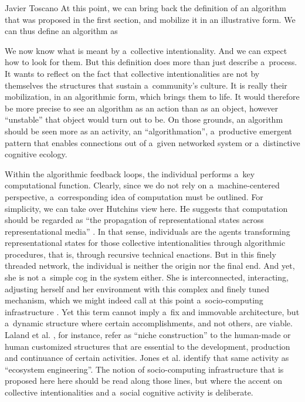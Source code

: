\begin{artengenv}{Javier Toscano}
At this point, we can bring back the definition of an algorithm that was proposed in the first section, and mobilize it in an illustrative form. We can thus define an algorithm as

We now know what is meant by a~collective intentionality. And we can expect how to look for them. But this definition does more than just describe a~process. It wants to reflect on the fact that collective intentionalities are not by themselves the structures that sustain a~community's culture. It is really their mobilization, in an algorithmic form, which brings them to life. It would therefore be more precise to see an algorithm as an action than as an object, however ``unstable'' that object would turn out to be. On those grounds, an algorithm should be seen more as an activity, an ``algorithmation'', a~productive emergent pattern that enables connections out of a~given networked system or a~distinctive cognitive ecology.

Within the algorithmic feedback loops, the individual performs a~key computational function. Clearly, since we do not rely on a~machine-centered perspective, a~corresponding idea of computation must be outlined. For simplicity, we can take over Hutchins view here. He suggests that computation should be regarded as ``the propagation of representational states across representational media''
\parencite[][p.118]{hutchins_cognition_1995}. %
 In that sense, individuals are the agents transforming representational states for those collective intentionalities through algorithmic procedures, that is, through recursive technical enactions. But in this finely threaded network, the individual is neither the origin nor the final end. And yet, she is not a~simple cog in the system either. She is interconnected, interacting, adjusting herself and her environment with this complex and finely tuned mechanism, which we might indeed call at this point a~socio-computing infrastructure 
\parencite[][]{toscano_intentionalities_nodate}. %
 Yet this term cannot imply a~fix and immovable architecture, but a~dynamic structure where certain accomplishments, and not others, are viable. Laland et al. 
\parencite*[][p.130]{laland_niche_2000}, %
 for instance, refer as ``niche construction'' to the human-made or human customized structures that are essential to the development, production and continuance of certain activities. Jones et al. 
\parencite*[][]{clark_being_1997} %
 identify that same activity as ``ecosystem engineering''. The notion of socio-computing infrastructure that is proposed here here should be read along those lines, but where the accent on collective intentionalities and a~social cognitive activity is deliberate.


\end{artengenv}
